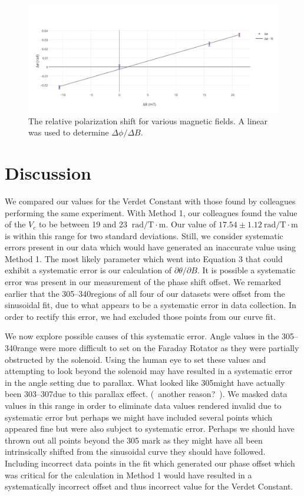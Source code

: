 \documentclass[prb,preprint]{revtex4-1}
\begin{document}
{{\begin{figure}
\includegraphics[width =6.3in]{verdet1.pdf}
\caption{\label{method2pic} The relative polarization shift for various magnetic fields. A linear was used to determine $\Delta \phi/\Delta B$.}
\end{figure}
}
\section{Discussion}

{We compared our values for the Verdet Constant with those found by colleagues performing the same experiment.  With Method 1, our colleagues found the value of the $V_{c}$ to be between 19 and 23 $\mathrm{~rad/T} \cdot \textrm{m}$.  Our value of $17.54 \pm 1.12 \mathrm{~rad/T} \cdot \textrm{m}$ is within this range for two standard deviations.  Still, we consider systematic errors present in our data which would have generated an inaccurate value using Method 1.  The most likely parameter which went into Equation 3 that could exhibit a systematic error is our calculation of $\partial \theta/\partial B$.  It is possible a systematic error was present in our measurement of the phase shift offset.  We remarked earlier that the 305\degree--340\degree regions of all four of our datasets were offset from the sinusoidal fit, due to what appears to be a systematic error in data collection.  In order to rectify this error, we had excluded those points from our curve fit. 

We now explore possible causes of this systematic error.  Angle values in the 305\degree--340\degree range were more difficult to set on the Faraday Rotator as they were partially obstructed by the solenoid.  Using the human eye to set these values and attempting to look beyond the solenoid may have resulted in a systematic error in the angle setting due to parallax.  What looked like 305\degree might have actually been 303\degree--307\degree due to this parallax effect.  (~another reason?~).  We masked data values in this range in order to eliminate data values rendered invalid due to systematic error but perhaps we might have included several points which appeared fine but were also subject to systematic error.  Perhaps we should have thrown out all points beyond the 305 \degree mark as they might have all been intrinsically shifted from the sinusoidal curve they should have followed.  Including incorrect data points in the fit which generated our phase offset which was critical for the calculation in Method 1 would have resulted in a systematically incorrect offset and thus incorrect value for the Verdet Constant.

}}
\end{document}
